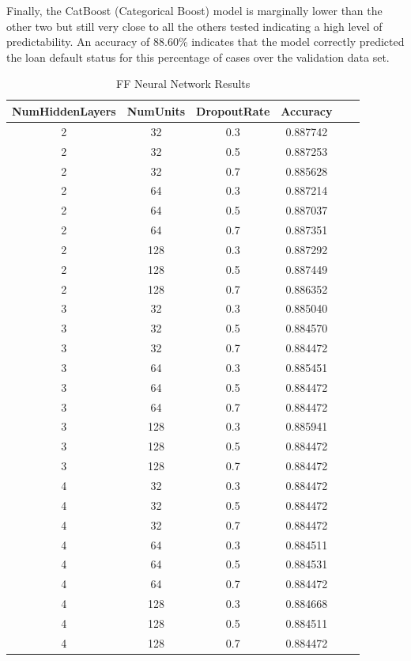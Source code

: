 \documentclass[12pt]{article}
\begin{document}
Finally, the CatBoost (Categorical Boost) model is marginally lower than the other two but still very close to all the others tested indicating a high level of predictability. An accuracy of 88.60\% indicates that the model correctly predicted the loan default status for this percentage of cases over the validation data set.

\begin{table}[htbp]
    \centering
    \caption{FF Neural Network Results}
    \begin{tabular}{cccccc}
        \toprule
        NumHiddenLayers & NumUnits & DropoutRate & Accuracy \\
        \midrule
        \rowcolor{green!25}2 & 32 & 0.3 & 0.887742 \\
        2 & 32 & 0.5 & 0.887253 \\
        2 & 32 & 0.7 & 0.885628 \\
        2 & 64 & 0.3 & 0.887214 \\
        2 & 64 & 0.5 & 0.887037 \\
        2 & 64 & 0.7 & 0.887351 \\
        2 & 128 & 0.3 & 0.887292 \\
        2 & 128 & 0.5 & 0.887449 \\
        2 & 128 & 0.7 & 0.886352 \\
        3 & 32 & 0.3 & 0.885040 \\
        3 & 32 & 0.5 & 0.884570 \\
        3 & 32 & 0.7 & 0.884472 \\
        3 & 64 & 0.3 & 0.885451 \\
        3 & 64 & 0.5 & 0.884472 \\
        3 & 64 & 0.7 & 0.884472 \\
        3 & 128 & 0.3 & 0.885941 \\
        3 & 128 & 0.5 & 0.884472 \\
        3 & 128 & 0.7 & 0.884472 \\
        4 & 32 & 0.3 & 0.884472 \\
        4 & 32 & 0.5 & 0.884472 \\
        4 & 32 & 0.7 & 0.884472 \\
        4 & 64 & 0.3 & 0.884511 \\
        4 & 64 & 0.5 & 0.884531 \\
        4 & 64 & 0.7 & 0.884472 \\
        4 & 128 & 0.3 & 0.884668 \\
        4 & 128 & 0.5 & 0.884511 \\
        4 & 128 & 0.7 & 0.884472 \\
        \bottomrule
    \end{tabular}
    \label{table:fFNeuralNetworkResults}
\end{table}
\end{document}
